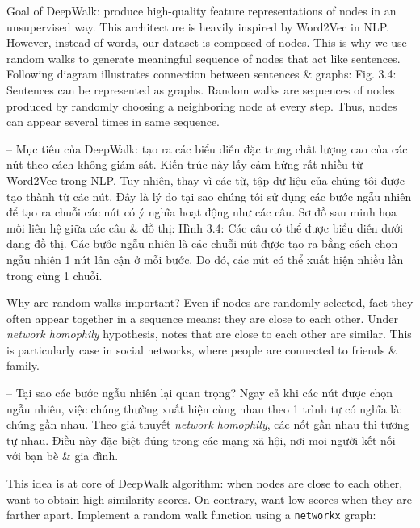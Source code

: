 \documentclass{article}
\begin{document}
\begin{itemize}
\begin{itemize}
        Goal of DeepWalk: produce high-quality feature representations of nodes in an unsupervised way. This architecture is heavily inspired by Word2Vec in NLP. However, instead of words, our dataset is composed of nodes. This is why we use random walks to generate meaningful sequence of nodes that act like sentences. Following diagram illustrates connection between sentences \& graphs: {\sf Fig. 3.4: Sentences can be represented as graphs}. Random walks are sequences of nodes produced by randomly choosing a neighboring node at every step. Thus, nodes can appear several times in same sequence.

        -- Mục tiêu của DeepWalk: tạo ra các biểu diễn đặc trưng chất lượng cao của các nút theo cách không giám sát. Kiến trúc này lấy cảm hứng rất nhiều từ Word2Vec trong NLP. Tuy nhiên, thay vì các từ, tập dữ liệu của chúng tôi được tạo thành từ các nút. Đây là lý do tại sao chúng tôi sử dụng các bước ngẫu nhiên để tạo ra chuỗi các nút có ý nghĩa hoạt động như các câu. Sơ đồ sau minh họa mối liên hệ giữa các câu \& đồ thị: {\sf Hình 3.4: Các câu có thể được biểu diễn dưới dạng đồ thị}. Các bước ngẫu nhiên là các chuỗi nút được tạo ra bằng cách chọn ngẫu nhiên 1 nút lân cận ở mỗi bước. Do đó, các nút có thể xuất hiện nhiều lần trong cùng 1 chuỗi.

        Why are random walks important? Even if nodes are randomly selected, fact they often appear together in a sequence means: they are close to each other. Under {\it network homophily} hypothesis, notes that are close to each other are similar. This is particularly case in social networks, where people are connected to friends \& family.

        -- Tại sao các bước ngẫu nhiên lại quan trọng? Ngay cả khi các nút được chọn ngẫu nhiên, việc chúng thường xuất hiện cùng nhau theo 1 trình tự có nghĩa là: chúng gần nhau. Theo giả thuyết {\it network homophily}, các nốt gần nhau thì tương tự nhau. Điều này đặc biệt đúng trong các mạng xã hội, nơi mọi người kết nối với bạn bè \& gia đình.

        This idea is at core of DeepWalk algorithm: when nodes are close to each other, want to obtain high similarity scores. On contrary, want low scores when they are farther apart. Implement a random walk function using a {\tt networkx} graph:


\end{itemize}
\end{itemize}
\end{document}
